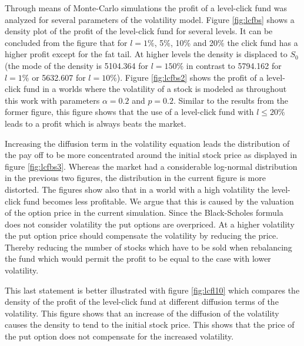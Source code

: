 \documentclass[a4paper,onecolumn]{IEEEtran}
\begin{document}
Through means of Monte-Carlo simulations the profit of a level-click fund was
analyzed for several parameters of the volatility model. Figure
\ref{fig:lcfbs} shows a density plot of the profit of the level-click fund for
several levels. It can be concluded from the figure that for $l = 1\%$, 5\%,
10\% and 20\% the click fund has a higher profit except for the fat tail. At
higher levels the density is displaced to $S_0$ (the mode of the density is
5104.364 for $l= 150\%$ in contrast to 5794.162 for $l=1\%$ or 5632.607 for
$l=10\%$). Figure \ref{fig:lcfbs2} shows the profit of a level-click fund in a
worlds where the volatility of a stock is modeled as throughout this work with
parameters $\alpha = 0.2$ and $p=0.2$. Similar to the results from the former
figure, this figure shows that the use of a level-click fund with $l \leq
20\%$ leads to a profit which is always beats the market.

Increasing the diffusion term in the volatility equation leads the
distribution of the pay off to be more concentrated around the initial stock
price as displayed in figure \ref{fig:lcfbs3}. Whereas the market had a
considerable log-normal distribution in the previous two figures, the
distribution in the current figure is more distorted. The figures show also
that in a world with a high volatility the level-click fund becomes less
profitable. We argue that this is caused by the valuation of the option price
in the current simulation. Since the Black-Scholes formula does not consider
volatility the put options are overpriced. At a higher volatility the put
option price should compensate the volatility by reducing the price. Thereby
reducing the number of stocks which have to be sold when rebalancing the fund
which would permit the profit to be equal to the case with lower volatility.

This last statement is better illustrated with figure \ref{fig:lcfl10}  which
compares the density of the profit of the level-click fund at different
diffusion terms of the volatility. This figure shows that an increase of the
diffusion of the volatility causes the density to tend to the initial stock
price. This shows that the price of the put option does not compensate for the
increased volatility.
\end{document}
